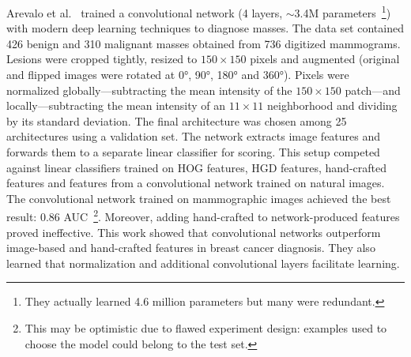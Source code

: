 \begin{comment}
- 50%
- Probable to overfit to the validation set.
- they select a model using the validation set and then join eveyrhting otgether an dmake a different division for 5 runs. This is not  a good practice, examples used to choose hyperparamteres and architecture will also appear in the new test sets so results will be better.
- combination of both 17 hand-crafted features plus convnet features (before Linear SVM) did not produce significant improvements.
\end{comment}
Arevalo et al.~\cite{Arevalo2016} trained a convolutional network (4 layers, $\sim$3.4M parameters~\footnote{They actually learned 4.6 million parameters but many were redundant.}) with modern deep learning techniques to diagnose masses. The data set contained 426 benign and 310 malignant masses obtained from 736 digitized mammograms. Lesions were cropped tightly, resized to $150\times150$ pixels and augmented (original and flipped images were rotated at 0°, 90°, 180° and 360°). 
Pixels were normalized globally---subtracting the mean intensity of the $150\times150$ patch---and locally---subtracting the mean intensity of an $11\times11$ neighborhood and dividing by its standard deviation.
The final architecture was chosen among 25 architectures using a validation set.
The network extracts image features and forwards them to a separate linear classifier for scoring.
This setup competed against linear classifiers trained on HOG features, HGD features, hand-crafted features and features from a convolutional network trained on natural images. The convolutional network trained on mammographic images achieved the best result: 0.86 AUC~\footnote{This may be optimistic due to flawed experiment design: examples used to choose the model could belong to the test set.}.
Moreover, adding hand-crafted to network-produced features proved ineffective.
This work showed that convolutional networks outperform image-based and hand-crafted features in breast cancer diagnosis. They also learned that normalization and additional convolutional layers facilitate learning.

